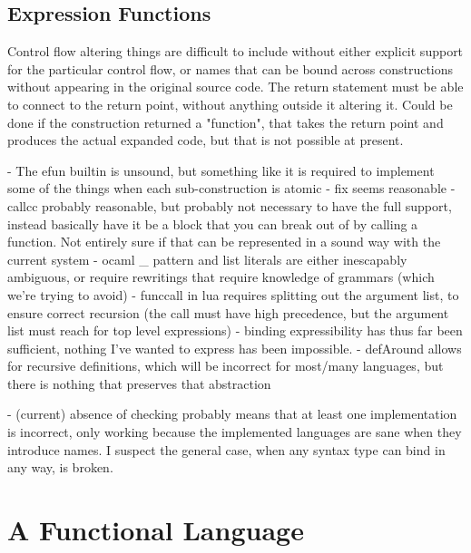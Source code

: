 \documentclass{kththesis}
\begin{document}
\subsection{Expression Functions} \label{sec:efun-drawbacks}


Control flow altering things are difficult to include without either explicit support for the particular control flow, or names that can be bound across constructions without appearing in the original source code. The return statement must be able to connect to the return point, without anything outside it altering it. Could be done if the construction returned a "function", that takes the return point and produces the actual expanded code, but that is not possible at present.

- The efun builtin is unsound, but something like it is required to implement some of the things when each sub-construction is atomic
- fix seems reasonable
- callcc probably reasonable, but probably not necessary to have the full support, instead basically have it be a block that you can break out of by calling a function. Not entirely sure if that can be represented in a sound way with the current system
- ocaml _ pattern and list literals are either inescapably ambiguous, or require rewritings that require knowledge of grammars (which we're trying to avoid)
- funccall in lua requires splitting out the argument list, to ensure correct recursion (the call must have high precedence, but the argument list must reach for top level expressions)
- binding expressibility has thus far been sufficient, nothing I've wanted to express has been impossible.
- defAround allows for recursive definitions, which will be incorrect for most/many languages, but there is nothing that preserves that abstraction

- (current) absence of checking probably means that at least one implementation is incorrect, only working because the implemented languages are sane when they introduce names. I suspect the general case, when any syntax type can bind in any way, is broken.

\section{A Functional Language} \label{sec:functional-eval}
\end{document}
